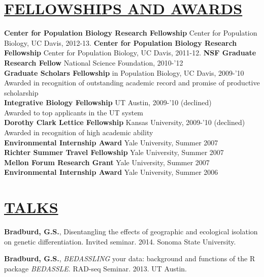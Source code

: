 \documentclass{res}
\begin{document}
\begin{resume}
\section{\underline{FELLOWSHIPS AND AWARDS}}
\textbf{Center for Population Biology Research Fellowship} Center for Population Biology, UC Davis, 2012-13.
\textbf{Center for Population Biology Research Fellowship} Center for Population Biology, UC Davis, 2011-12.
\textbf{NSF Graduate Research Fellow} National Science Foundation, 2010-'12\\ \vspace{0.3mm}
\textbf{Graduate Scholars Fellowship} in Population Biology, UC Davis, 2009-'10\\ \vspace{0.3mm}
\hspace{4.5mm}Awarded in recognition of outstanding academic record and promise of productive scholarship\\
\textbf{Integrative Biology Fellowship} UT Austin, 2009-'10 (declined)\\ \vspace{0.3mm}
\hspace{4.5mm}Awarded to top applicants in the UT system\\
\textbf{Dorothy Clark Lettice Fellowship} Kansas University, 2009-'10 (declined)\\  \vspace{0.3mm}
\hspace{4.5mm}Awarded in recognition of high academic ability\\
\textbf{Environmental Internship Award} Yale University, Summer 2007\\ 
\textbf{Richter Summer Travel Fellowship} Yale University, Summer 2007\\
\textbf{Mellon Forum Research Grant} Yale University, Summer 2007\\
\textbf{Environmental Internship Award} Yale University, Summer 2006\\

\section{\underline{TALKS}}

\textbf{Bradburd, G.S.}, Disentangling the effects of geographic and ecological isolation on genetic differentiation.  Invited seminar.  2014.  Sonoma State University.

\textbf{Bradburd, G.S.}, \textit{BEDASSLING} your data: background and functions of the R package \textit{BEDASSLE}.  RAD-seq Seminar. 2013. UT Austin.


\end{resume}
\end{document}
